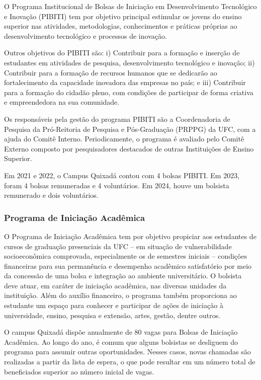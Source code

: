 O Programa Institucional de Bolsas de Iniciação em Desenvolvimento Tecnológico e Inovação (PIBITI) tem por objetivo principal estimular os jovens do ensino superior nas atividades, metodologias, conhecimentos e práticas próprias ao desenvolvimento tecnológico e processos de inovação. 

Outros objetivos do PIBITI são: i) Contribuir para a formação e inserção de estudantes em atividades de pesquisa, desenvolvimento tecnológico e inovação; ii) Contribuir para a formação de recursos humanos que se dedicarão ao fortalecimento da capacidade inovadora das empresas no país; e iii) Contribuir para a formação do cidadão pleno, com condições de participar de forma criativa e empreendedora na sua comunidade.



Os responsáveis pela gestão do programa PIBITI são a Coordenadoria de Pesquisa da Pró-Reitoria de Pesquisa e Pós-Graduação (PRPPG) da UFC, com a ajuda do Comitê Interno. Periodicamente, o programa é avaliado pelo Comitê Externo composto por pesquisadores destacados de outras Instituições de Ensino Superior.

Em 2021 e 2022, o Campus Quixadá contou com 4 bolsas PIBITI. Em 2023, foram 4 bolsas remuneradas e 4 voluntários. Em 2024, houve um bolsista remunerado e dois voluntários.

\subsubsection{Programa de Iniciação Acadêmica}

O Programa de Iniciação Acadêmica tem por objetivo  propiciar aos estudantes de cursos de graduação presenciais da UFC – em situação de vulnerabilidade socioeconômica comprovada, especialmente os de semestres iniciais – condições financeiras para sua permanência e desempenho acadêmico satisfatório por meio  da concessão de uma bolsa e integração ao ambiente universitário. O bolsista deve atuar, em caráter de iniciação acadêmica, nas diversas unidades da instituição. Além do auxílio financeiro, o programa também proporciona ao estudante um espaço para conhecer e participar de ações de iniciação à universidade, ensino, pesquisa e extensão, artes, gestão, dentre outros.

O campus Quixadá dispõe anualmente de 80 vagas para Bolsas de Iniciação Acadêmica. Ao longo do ano, é comum que alguns bolsistas se desliguem do programa para assumir outras oportunidades. Nesses casos, novas chamadas são realizadas a partir da lista de espera, o que pode resultar em um número total de beneficiados superior ao número inicial de vagas.


